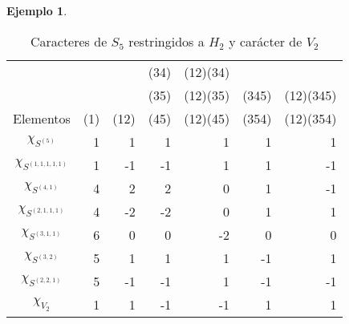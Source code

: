 \documentclass[12pt]{book}
\theoremstyle{definition}
\newtheorem{example}[theorem]{Ejemplo}
\newcounter{in}
\begin{document}
\begin{example}
\begin{table}[!hbtp]
  \centering
  \begin{tabular}{c |r r r r r r}
    &     &      & (34) & (12)(34) &       &  \\
    &     &      & (35) & (12)(35) & (345) & (12)(345) \\
    Elementos & (1) & (12) & (45) & (12)(45) & (354) & (12)(354) \\
    \hline
    $\chi_{S^{(5)}}$ & 1 & 1  & 1  & 1 & 1 & 1 \\
    $\chi_{S^{(1,1,1,1,1)}}$ & 1 & -1 & -1 & 1 & 1 & -1\\
    $\chi_{S^{(4,1)}}$ & 4 & 2  & 2  & 0 & 1 & -1\\
    $\chi_{S^{(2,1,1,1)}}$ & 4 & -2 & -2 & 0 & 1 & 1\\
    $\chi_{S^{(3,1,1)}}$ & 6 & 0  & 0  & -2& 0 & 0\\
    $\chi_{S^{(3,2)}}$ & 5 & 1  & 1  & 1 & -1& 1\\
    $\chi_{S^{(2,2,1)}}$ & 5 & -1 & -1 & 1 & -1& -1\\
    \hline
    $\chi_{V_{2}}$ & 1 & 1 & -1 & -1& 1 & 1\\
  \end{tabular}

  \caption{Caracteres de $S_{5}$ restringidos a $H_{2}$ y carácter de $V_{2}$}
  \label{tab:clanes-H_2-5}
\end{table}


\end{example}
\end{document}
